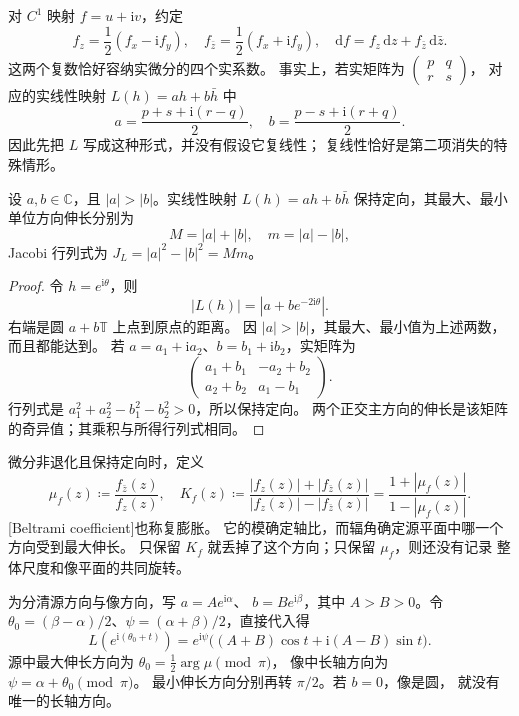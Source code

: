 对 \(C^1\) 映射 \(f=u+\mathrm i v\)，约定
\[
 f_z=\frac12(f_x-\mathrm i f_y),\quad
 f_{\bar z}=\frac12(f_x+\mathrm i f_y),\quad
 \mathrm df=f_z\,\mathrm dz+f_{\bar z}\,\mathrm d\bar z.
\]
这两个复数恰好容纳实微分的四个实系数。
事实上，若实矩阵为 \(\left(\begin{smallmatrix}p&q\\ r&s\end{smallmatrix}\right)\)，
对应的实线性映射 \(L(h)=ah+b\bar h\) 中
\[
 a=\frac{p+s+\mathrm i(r-q)}2,\quad
 b=\frac{p-s+\mathrm i(r+q)}2.
\]
因此先把 \(L\) 写成这种形式，并没有假设它复线性；
复线性恰好是第二项消失的特殊情形。

\begin{proposition}[微分的伸缩]\label{b3:prop:B-linear-dilatation}
设 \(a,b\in\mathbb C\)，且 \(|a|>|b|\)。实线性映射
\(L(h)=ah+b\bar h\) 保持定向，其最大、最小单位方向伸长分别为
\[
 M=|a|+|b|,\quad m=|a|-|b|,
\]
Jacobi 行列式为 \(J_L=|a|^2-|b|^2=Mm\)。
\end{proposition}
\begin{proof}
令 \(h=e^{\mathrm i\theta}\)，则
\[
 |L(h)|=|a+b e^{-2\mathrm i\theta}|.
\]
右端是圆 \(a+b\mathbb T\) 上点到原点的距离。
因 \(|a|>|b|\)，其最大、最小值为上述两数，而且都能达到。
若 \(a=a_1+\mathrm i a_2\)、\(b=b_1+\mathrm i b_2\)，实矩阵为
\[
 \begin{pmatrix}a_1+b_1&-a_2+b_2\\a_2+b_2&a_1-b_1\end{pmatrix}.
\]
行列式是 \(a_1^2+a_2^2-b_1^2-b_2^2>0\)，所以保持定向。
两个正交主方向的伸长是该矩阵的奇异值；其乘积与所得行列式相同。
\end{proof}
微分非退化且保持定向时，定义
\[
 \mu_f(z)\coloneqq\frac{f_{\bar z}(z)}{f_z(z)},\quad
 K_f(z)\coloneqq\frac{|f_z(z)|+|f_{\bar z}(z)|}
                         {|f_z(z)|-|f_{\bar z}(z)|}
              =\frac{1+|\mu_f(z)|}{1-|\mu_f(z)|}.
\]
[Beltrami coefficient]也称复膨胀。
它的模确定轴比，而辐角确定源平面中哪一个方向受到最大伸长。
只保留 \(K_f\) 就丢掉了这个方向；只保留 \(\mu_f\)，则还没有记录
整体尺度和像平面的共同旋转。

\ProseParagraphBreak

为分清源方向与像方向，写 \(a=Ae^{\mathrm i\alpha}\)、
\(b=Be^{\mathrm i\beta}\)，其中 \(A>B>0\)。令
\(\theta_0=(\beta-\alpha)/2\)、\(\psi=(\alpha+\beta)/2\)，直接代入得
\[
 L(e^{\mathrm i(\theta_0+t)})
 =e^{\mathrm i\psi}\bigl((A+B)\cos t
                    +\mathrm i(A-B)\sin t\bigr).
\]
源中最大伸长方向为 \(\theta_0=\tfrac12\arg\mu\pmod\pi\)，
像中长轴方向为 \(\psi=\alpha+\theta_0\pmod\pi\)。
最小伸长方向分别再转 \(\pi/2\)。若 \(b=0\)，像是圆，
就没有唯一的长轴方向。

